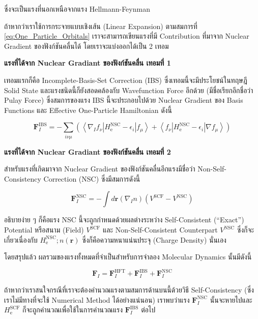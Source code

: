 \noindent ซึ่งจะเป็นแรงที่นอกเหนือจากแรง Hellmann-Feynman

ถ้าหากว่าเราใช้การกระจายแบบเชิงเส้น (Linear Expansion) ตามสมการที่ \eqref{eq:One_Particle_Orbitals} เราจะสามารถเขียนแรงที่มี
Contribution ที่มาจาก Nuclear Gradient ของฟังก์ชันคลื่นได้ โดยเราจะแบ่งออกได้เป็น 2 เทอม

\noindent \textbf{แรงที่ได้จาก Nuclear Gradiant ของฟังก์ชันคลื่น เทอมที่ 1}

เทอมแรกก็คือ Incomplete-Basis-Set Correction (IBS) ซึ่งเทอมนี้จะมีประโยชน์ในทฤษฎี Solid State และแรงชนิดนี้ก็ยังสอดคล้องกับ
Wavefunction Force อีกด้วย (มีชื่อเรียกอีกชื่อว่า Pulay Force) ซึ่งสมการของแรง IBS นี้จะประกอบไปด้วย Nuclear Gradient ของ
Basis Functions และ Effective One-Particle Hamiltonian ดังนี้

\begin{equation}
  \mathbf{F}_I^{\mathrm{IBS}}
  =
  - \sum_{i \nu \mu}\left(\left\langle\nabla_I f_\nu\left| H_{\mathrm{e}}^{\mathrm{NSC}}-\epsilon_i\right| f_\mu\right\rangle
  + \left\langle f_\nu\left| H_{\mathrm{e}}^{\mathrm{NSC}}-\epsilon_i\right| \nabla f_\mu\right\rangle\right)
\end{equation}

\noindent \textbf{แรงที่ได้จาก Nuclear Gradiant ของฟังก์ชันคลื่น เทอมที่ 2}

สำหรับแรงที่เกิดมาจาก Nuclear Gradient ของฟังก์ชันคลื่นอีกแรงมีชื่อว่า Non-Self-Consistency Correction (NSC) ซึ่งมีสมการดังนี้

\begin{equation}
  \mathbf{F}_I^{\mathrm{NSC}}
  =
  - \int d \mathbf{r}\left(\nabla_I n\right)\left(V^{\mathrm{SCF}}-V^{\mathrm{NSC}}\right)
\end{equation}

\noindent อธิบายง่าย ๆ ก็คือแรง NSC นี้จะถูกกำหนดด้วยผลต่างระหว่าง Self-Consistent (\enquote{Exact}) Potential หรือสนาม
(Field) $V^{\mathrm{SCF}}$ และ Non-Self-Consistent Counterpart $V^{\mathrm{NSC}}$ ซึ่งก็จะเกี่ยวเนื่องกับ
$H_{\mathrm{e}}^{\mathrm{NSC}} ; n(\mathbf{r})$ ซึ่งก็คือความหนาแน่นประจุ (Charge Density) นั่นเอง

โดยสรุปแล้ว ผลรวมของแรงทั้งหมดที่จำเป็นสำหรับการจำลอง  Molecular Dynamics นั้นมีดังนี้

\begin{equation}
  \mathbf{F}_I
  =
  \mathbf{F}_I^{\mathrm{HFT}}
  + \mathbf{F}_I^{\mathrm{IBS}}
  + \mathbf{F}_I^{\mathrm{NSC}}
\end{equation}

\noindent ถ้าหากว่าเราสนใจกรณีที่เราจะต้องคำนวณแรงตามสมการด้านบนนี้ด้วยวิธี Self-Consistency (ซึ่งเราไม่มีทางที่จะใช้ Numerical
Method ได้อย่างแน่นอน) เราพบว่าแรง $\mathbf{F}_I^{\mathrm{NSC}}$ นั้นจะหายไปและ $ H_{\mathrm{e}}^{\mathrm{SCF}}$
ก็จะถูกคำนวณเพื่อใช้ในการคำนวณแรง $\mathbf{F}_I^{\mathrm{IBS}}$ ต่อไป

